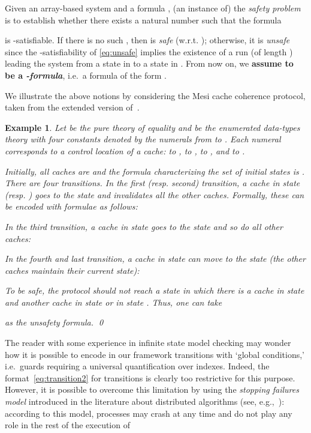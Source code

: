 \documentclass{LMCS}
\theoremstyle{plain}\newtheorem{assumption}[thm]{Assumption}
\theoremstyle{plain}\newtheorem{proposition}[thm]{Proposition}
\theoremstyle{plain}\newtheorem{property}[thm]{Property}
\theoremstyle{plain}\newtheorem{example}[thm]{Example}
\theoremstyle{plain}\newtheorem{claim}[thm]{Claim}
\theoremstyle{plain}\newtheorem{lemma}[thm]{Lemma}
\begin{document}
Given an array-based system  and a formula ,
(an instance of) the \emph{safety problem} is to establish whether
there exists a natural number  such that the formula

is -satisfiable. If there is no such , then  is
\emph{safe} (w.r.t. ); otherwise, it is \emph{unsafe} since the
-satisfiability of \eqref{eq:unsafe} implies the existence of a
run (of length ) leading the system from a state in  to a state
in .  From now on, we \textbf{assume  to be a
  \emph{-formula}}, i.e.\ a formula of the form .

We illustrate the above notions by considering the Mesi cache
coherence protocol, taken from the extended version of~\cite{tacas06}.
\begin{example}\em
  \label{ex:one}
  Let  be the pure theory of equality and  be the enumerated
data-types theory with four constants denoted by the numerals from
   to .  Each numeral corresponds to a control location of a
  cache:  to ,  to , 
  to , and  to .


  Initially, all caches are  and the formula
  characterizing the set of initial states is .
  There are four transitions.  In the first (resp. second) transition,
  a cache in state  (resp. ) goes
  to the state  and invalidates all the other
  caches. Formally, these can be encoded with formulae as follows:

  In the third transition, a cache in state  goes to
  the state  and so do all other caches:
  
  In the fourth and last transition, a cache in state
   can move to the state  (the
  other caches maintain their current state):
  
  To be safe, the protocol should not reach a state in which there is
  a cache in state  and another cache in state
   or in state .  Thus, one can
  take
  
  as the unsafety formula. \qed
\end{example}
The reader with some experience in infinite state model checking may
  wonder how it is possible to encode in our framework transitions
  with `global conditions,' i.e.\ guards requiring a universal
  quantification over indexes.  Indeed, the
  format~\eqref{eq:transition2} for transitions is clearly too
  restrictive for this purpose.  However, it is possible to overcome
  this limitation by using the \emph{stopping failures model}
  introduced in the literature about distributed algorithms (see,
  e.g.,~\cite{dalg}): according to this model, processes may crash at
  any time and do not play any role in the rest of the execution of
\end{document}
